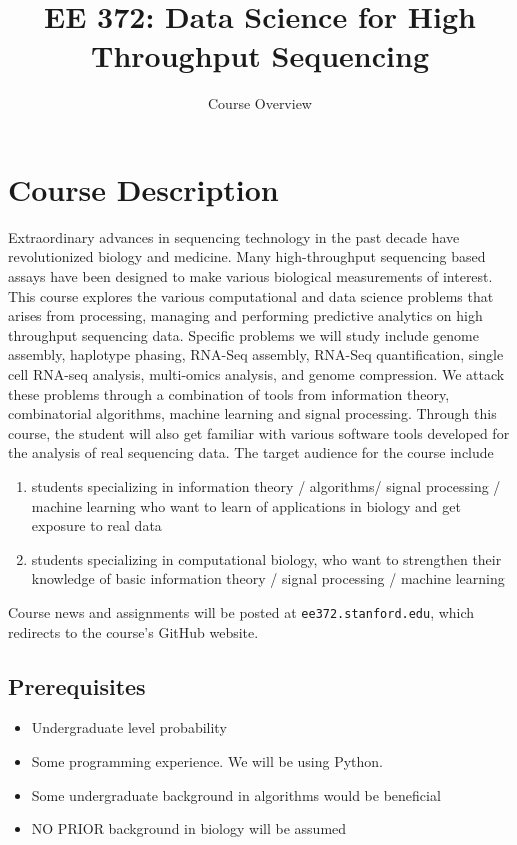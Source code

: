 \documentclass[11pt,onecolumn]{article}
\title{EE 372: Data Science for High Throughput Sequencing}
\author{Course Overview}
\date{\vspace{-5ex}}
\begin{document}
\maketitle

\section*{Course Description}
Extraordinary advances in sequencing technology in the past decade have revolutionized biology and medicine. Many high-throughput sequencing based assays have been designed to make various biological measurements of interest. This course explores the various computational and data science problems that arises from processing, managing and performing predictive analytics on high throughput sequencing data. Specific problems we will study include genome assembly, haplotype phasing, RNA-Seq assembly, RNA-Seq quantification, single cell RNA-seq analysis, multi-omics analysis, and genome compression. We attack these problems through a combination of tools from information theory, combinatorial algorithms, machine learning and signal processing. Through this course, the student will also get familiar with various software tools developed for the analysis of real sequencing data. The target audience for the course include
\begin{enumerate}
	\itemsep0em 
	\item students specializing in information theory / algorithms/ signal processing / machine learning who want to learn of applications in biology and get exposure to real data
	\item students specializing in computational biology, who want to strengthen their knowledge of basic information theory / signal processing / machine learning
\end{enumerate}
Course news and assignments will be posted at \texttt{ee372.stanford.edu}, which redirects to the course's GitHub website.

\subsection*{Prerequisites}
\begin{itemize}
	\itemsep0em 
	\item Undergraduate level probability
	\item Some programming experience. We will be using Python.
	\item Some undergraduate background in algorithms would be beneficial
	\item NO PRIOR background in biology will be assumed
\end{itemize}
\end{document}
